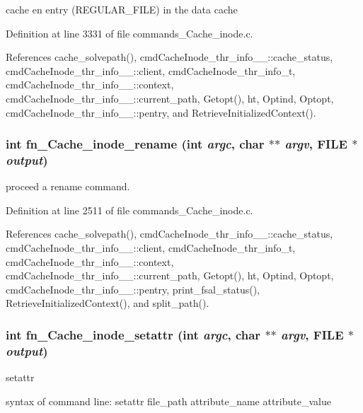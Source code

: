 cache en entry (REGULAR\_\-FILE) in the data cache 

Definition at line 3331 of file commands\_\-Cache\_\-inode.c.

References cache\_\-solvepath(), cmd\-Cache\-Inode\_\-thr\_\-info\_\-\_\-::cache\_\-status, cmd\-Cache\-Inode\_\-thr\_\-info\_\-\_\-::client, cmd\-Cache\-Inode\_\-thr\_\-info\_\-t, cmd\-Cache\-Inode\_\-thr\_\-info\_\-\_\-::context, cmd\-Cache\-Inode\_\-thr\_\-info\_\-\_\-::current\_\-path, Getopt(), ht, Optind, Optopt, cmd\-Cache\-Inode\_\-thr\_\-info\_\-\_\-::pentry, and Retrieve\-Initialized\-Context().
\subsubsection{\setlength{\rightskip}{0pt plus 5cm}int fn\_\-Cache\_\-inode\_\-rename (int {\em argc}, char $\ast$$\ast$ {\em argv}, FILE $\ast$ {\em output})}\label{commands__Cache__inode_8c_a39}


proceed a rename command. 

Definition at line 2511 of file commands\_\-Cache\_\-inode.c.

References cache\_\-solvepath(), cmd\-Cache\-Inode\_\-thr\_\-info\_\-\_\-::cache\_\-status, cmd\-Cache\-Inode\_\-thr\_\-info\_\-\_\-::client, cmd\-Cache\-Inode\_\-thr\_\-info\_\-t, cmd\-Cache\-Inode\_\-thr\_\-info\_\-\_\-::context, cmd\-Cache\-Inode\_\-thr\_\-info\_\-\_\-::current\_\-path, Getopt(), ht, Optind, Optopt, cmd\-Cache\-Inode\_\-thr\_\-info\_\-\_\-::pentry, print\_\-fsal\_\-status(), Retrieve\-Initialized\-Context(), and split\_\-path().
\subsubsection{\setlength{\rightskip}{0pt plus 5cm}int fn\_\-Cache\_\-inode\_\-setattr (int {\em argc}, char $\ast$$\ast$ {\em argv}, FILE $\ast$ {\em output})}\label{commands__Cache__inode_8c_a41}


setattr

syntax of command line: setattr file\_\-path attribute\_\-name attribute\_\-value 

